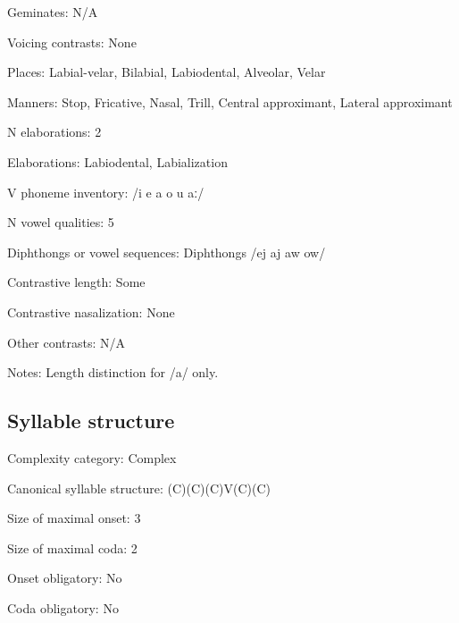 {\begin{appendixdesc}
\item[Geminates:] N/A

\item[Voicing contrasts:] None

\item[Places:] Labial-velar, Bilabial, Labiodental, Alveolar, Velar

\item[Manners:] Stop, Fricative, Nasal, Trill, Central approximant, Lateral approximant

\item[N elaborations:] 2

\item[Elaborations:] Labiodental, Labialization

\item[V phoneme inventory:] /i e a o u aː/

\item[N vowel qualities:] 5

\item[Diphthongs or vowel sequences:] Diphthongs /ej aj aw ow/

\item[Contrastive length:] Some

\item[Contrastive nasalization:] None

\item[Other contrasts:] N/A

\item[Notes:] Length distinction for /a/ only.
\end{appendixdesc}
\subsection*{Syllable structure}
\begin{appendixdesc}

\item[Complexity category:] Complex

\item[Canonical syllable structure:] (C)(C)(C)V(C)(C) \citep[41--48]{Lacrampe2014}

\item[Size of maximal onset:] 3

\item[Size of maximal coda:] 2

\item[Onset obligatory:] No

\item[Coda obligatory:] No


\end{appendixdesc}}
